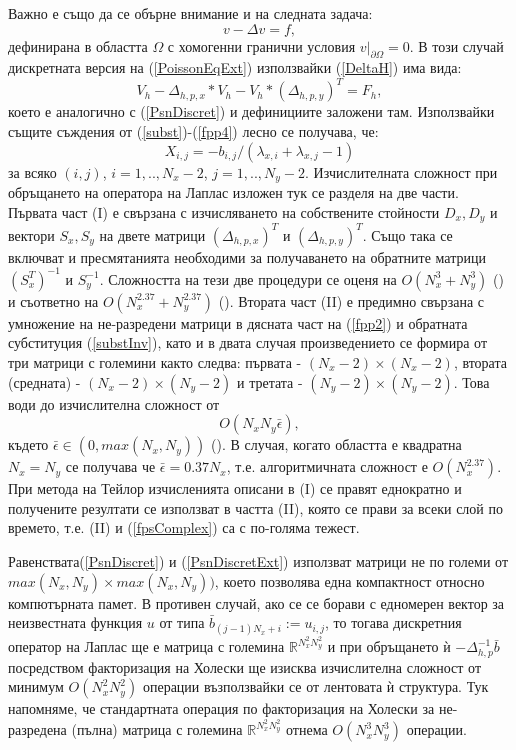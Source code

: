 \documentclass{article}
\newcommand{\be}{\begin{equation}}
\newcommand{\ee}{\end{equation}}
\newcommand{\rf}[1]{(\ref{#1})}
\newcommand{\RR}{\mathbb{R}}
\begin{document}
Важно е също да се обърне внимание и на следната задача:
\be\label{PoissonEqExt}
v-\Delta v = f,
\ee
дефинирана в областта $\Omega$ с хомогенни гранични условия $v \big|_{\partial\Omega} = 0$. В този случай дискретната версия на \rf{PoissonEqExt} използвайки \rf{DeltaH} има вида:
\be\label{PsnDiscretExt}
V_h - \Delta_{h,p,x} * V_h - V_h * (\Delta_{h,p,y}) ^{T}  = F_h,
\ee
което е аналогично с \rf{PsnDiscret} и дефинициите заложени там. Използвайки същите съждения от \rf{subst}-\rf{fpp4} лесно се получава, че:
\be\label{fpp4Ext}
X_{i,j} = - b_{i,j}/(\lambda_{x,i}  + \lambda_{x,j} -1)
\ee
за всяко $(i,j)$, $i = 1,..,N_x-2$, $j = 1,..,N_y-2 $.
Изчислителната сложност при обръщането на оператора на Лаплас изложен тук се разделя на две части. Първата част (I) е свързана с изчисляването на собствените стойности $D_x, D_y$ и вектори $S_x, S_y$ на двете матрици $(\Delta_{h,p,x})^T$ и $(\Delta_{h,p,y})^T$. Също така се включват и пресмятанията необходими за получаването на обратните матрици $(S_x^T)^{-1}$ и $S_y^{-1}$. Сложността на тези две процедури се оценя на $O(N_x^3+N_y^3)$ (\cite{ref260}) и съответно на $O(N_x^{2.37}+N_y^{2.37})$ (\cite{ref27}). Втората част (II) е предимно свързана с умножение на не-разредени матрици в дясната част на \rf{fpp2} и обратната субституция \rf{substInv}, като и в двата случая произведението се формира от три матрици  с големини както следва: първата - $(N_x-2) \times (N_x-2)$, втората (средната) - $(N_x-2) \times (N_y-2)$ и третата - $(N_y-2) \times (N_y-2)$. Това води до изчислителна сложност от 
\be\label{fpsComplex}
O(N_x N_y \bar{\epsilon}),
\ee
където $\bar{\epsilon} \in (0, max(N_x, N_y))$ (\cite{ref26, ref27}). В случая, когато областта е квадратна $N_x = N_y$ се получава че $\bar{\epsilon} = 0.37 N_x$, т.е. алгоритмичната сложност е $O(N_x^{2.37})$. При метода на Тейлор изчисленията описани в (I) се правят еднократно и получените резултати се използват в частта (II), която се прави за всеки слой по времето, т.е. (II) и \rf{fpsComplex} са с по-голяма тежест. 

Равенствата\rf{PsnDiscret} и \rf{PsnDiscretExt} използват матрици не по големи от $max(N_x, N_y) \times max(N_x, N_y))$, което позволява една компактност относно компютърната памет. В противен случай, ако се се борави с едномерен вектор за неизвестната функция $u$ от типа $\bar {b}_{(j-1)N_x + i} := u_{i,j}$, то тогава дискретния оператор на Лаплас ще е матрица с големина $\RR^{N_x^2 N_y^2}$ и при обръщането ѝ $-\Delta_{h,p}^{-1}\bar {b}$ посредством факторизация на Холески ще изисква изчислителна сложност от минимум $O(N_x^2 N_y^2)$ операции възползвайки се от лентовата ѝ структура. Тук напомняме, че стандартната операция по факторизация на Холески за не-разредена (пълна) матрица с големина $\RR^{N_x^2 N_y^2}$ отнема $O(N_x^3 N_y^3)$ операции.
\end{document}
